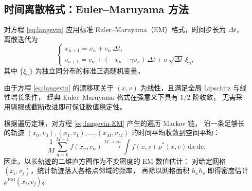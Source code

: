 %	
%	
%	
	
	\subsection{时间离散格式：Euler--Maruyama 方法}
	
	对方程 \eqref{eq:langevin} 应用标准 Euler--Maruyama（EM）格式，时间步长为 $\Delta t$，
	离散迭代为
	\begin{equation}\label{eq:langevin-EM}
		\begin{cases}
			x_{n+1} = x_n + v_n\,\Delta t, \\
			v_{n+1} = v_n + (-x_n - \gamma v_n)\,\Delta t + \sigma\,\sqrt{\Delta t}\,\xi_n,
		\end{cases}
	\end{equation}
	其中 $\{\xi_n\}$ 为独立同分布的标准正态随机变量。
	
	由于方程 \eqref{eq:langevin} 的漂移项关于 $(x, v)$ 为线性，且满足全局 Lipschitz 与线性增长条件，
	经典 Euler--Maruyama 格式在强意义下具有 $1/2$ 阶收敛，
	无需采用驯服或截断改进即可保证数值稳定性。
	
	根据遍历定理，对方程 \eqref{eq:langevin-EM} 产生的遍历 Markov 链，
	沿一条足够长的轨迹 $(x_0, v_0), (x_1, v_1), \dots, (x_M, v_M)$ 的时间平均收敛到空间平均：
	\[
	\frac{1}{M}\sum_{n=0}^{M-1} f(x_n, v_n)
	\xrightarrow{M\to\infty}
	\int f(x, v)\,\rho^*(x, v)\,\mathrm{d}x\,\mathrm{d}v.
	\]
	因此，以长轨迹的二维直方图作为不变密度的 EM 数值估计：
	对给定网格 $(x_i, v_j)$，统计轨迹落入各格点邻域的频率，
	再除以网格面积 $h_x h_v$ 即得密度估计 $\rho^{\mathrm{EM}}(x_i, v_j)$。
	
